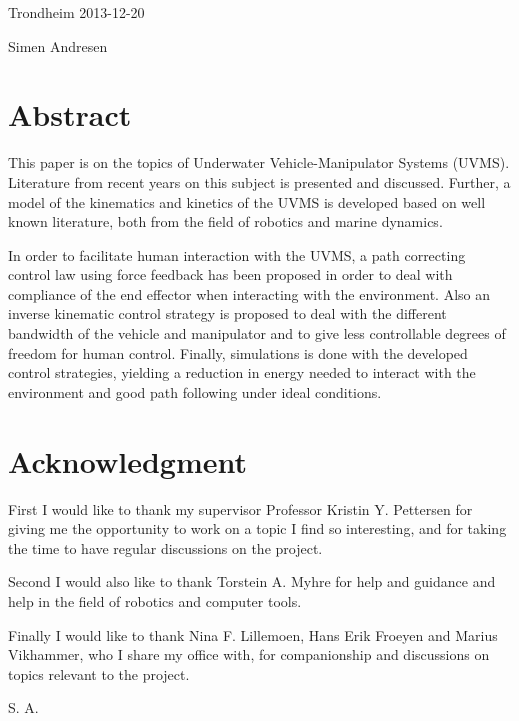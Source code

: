 {
	\centering Trondheim 2013-12-20

}

\bigskip
\bigskip

{
	\centering Simen Andresen

}

\cleardoublepage
\raggedright


\section*{Abstract}
This paper is on the topics of Underwater Vehicle-Manipulator Systems (UVMS). Literature from recent years on this subject is presented and discussed. Further, a model of the kinematics and kinetics of the UVMS is developed based on well known literature, both from the field of robotics and marine dynamics. 

In order to facilitate human interaction with the UVMS, a path correcting control law using force feedback has been proposed in order to deal with compliance of the end effector when interacting with the environment. Also an inverse kinematic control strategy is proposed to deal with the different bandwidth of the vehicle and manipulator and to give less controllable degrees of freedom for human control. Finally, simulations is done with the developed control strategies, yielding a reduction in energy needed to interact with the environment and good path following under ideal conditions.  


\cleardoublepage


\section*{Acknowledgment}
First I would like to thank my supervisor Professor Kristin Y. Pettersen for giving me the opportunity to work on a topic I find so interesting, and for taking the time to have regular discussions on the project. 

\bigskip
\noindent Second I would also like to thank Torstein A. Myhre for help and guidance and help in the field of robotics and computer tools.

\bigskip
\noindent
Finally I would like to thank Nina F. Lillemoen, Hans Erik Froeyen and Marius Vikhammer, who I share my office with, for companionship and discussions on topics relevant to the project.
\bigskip
\bigskip

{ 
	\raggedleft S. A.

}
\cleardoublepage

